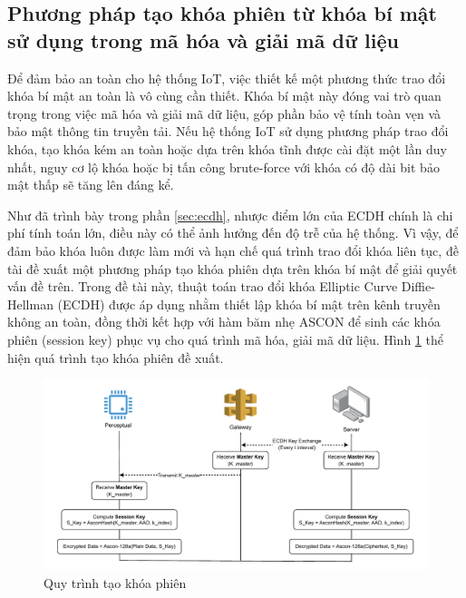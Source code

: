 \subsection{Phương pháp tạo khóa phiên từ khóa bí mật sử dụng trong mã hóa và giải mã dữ liệu}
\label{sec:key}
Để đảm bảo an toàn cho hệ thống IoT, việc thiết kế một phương thức trao đổi khóa bí mật an toàn là vô cùng cần thiết. Khóa bí mật này đóng vai trò quan trọng trong việc mã hóa và giải mã dữ liệu, góp phần bảo vệ tính toàn vẹn và bảo mật thông tin truyền tải. Nếu hệ thống IoT sử dụng phương pháp trao đổi khóa, tạo khóa kém an toàn hoặc dựa trên khóa tĩnh được cài đặt một lần duy nhất, nguy cơ lộ khóa hoặc bị tấn công brute-force với khóa có độ dài bit bảo mật thấp sẽ tăng lên đáng kể. 

Như đã trình bày trong phần \ref{sec:ecdh}, nhược điểm lớn của ECDH chính là chi phí tính toán lớn, điều này có thể ảnh hưởng đến độ trễ của hệ thống. Vì vậy, để đảm bảo khóa luôn được làm mới và hạn chế quá trình trao đổi khóa liên tục, đề tài đề xuất một phương pháp tạo khóa phiên dựa trên khóa bí mật để giải quyết vấn đề trên. Trong đề tài này, thuật toán trao đổi khóa Elliptic Curve Diffie-Hellman (ECDH) được áp dụng nhằm thiết lập khóa bí mật trên kênh truyền không an toàn, đồng thời kết hợp với hàm băm nhẹ ASCON để sinh các khóa phiên (session key) phục vụ cho quá trình mã hóa, giải mã dữ liệu. Hình \ref{fig:skey} thể hiện quá trình tạo khóa phiên đề xuất.

\begin{figure}[h]
    \centering
    \includegraphics[width=1\linewidth]{skey.pdf}
    \caption{Quy trình tạo khóa phiên}
    \label{fig:skey}
\end{figure}

